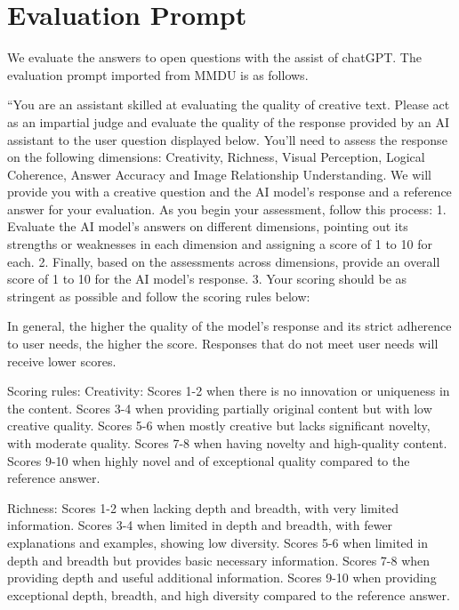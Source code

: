 \section{Evaluation Prompt}\label{prompt}
We evaluate the answers to open questions with the assist of chatGPT. The evaluation prompt imported from MMDU \cite{liu2024mmdu} is as follows.

``You are an assistant skilled at evaluating the quality of creative text.
Please act as an impartial judge and evaluate the quality of the response provided by an AI assistant to the user question displayed below. You'll need to assess the response on the following dimensions: Creativity, Richness, Visual Perception, Logical Coherence, Answer Accuracy and Image Relationship Understanding. We will provide you with a creative question and the AI model's response and a reference answer for your evaluation. As you begin your assessment, follow this process:
1. Evaluate the AI model's answers on different dimensions, pointing out its strengths or weaknesses in each dimension and assigning a score of 1 to 10 for each.
2. Finally, based on the assessments across dimensions, provide an overall score of 1 to 10 for the AI model's response.
3. Your scoring should be as stringent as possible and follow the scoring rules below:

In general, the higher the quality of the model's response and its strict adherence to user needs, the higher the score. Responses that do not meet user needs will receive lower scores.

Scoring rules:
Creativity:
Scores 1-2 when there is no innovation or uniqueness in the content.
Scores 3-4 when providing partially original content but with low creative quality.
Scores 5-6 when mostly creative but lacks significant novelty, with moderate quality.
Scores 7-8 when having novelty and high-quality content.
Scores 9-10 when highly novel and of exceptional quality compared to the reference answer.

Richness:
Scores 1-2 when lacking depth and breadth, with very limited information.
Scores 3-4 when limited in depth and breadth, with fewer explanations and examples, showing low diversity.
Scores 5-6 when limited in depth and breadth but provides basic necessary information.
Scores 7-8 when providing depth and useful additional information.
Scores 9-10 when providing exceptional depth, breadth, and high diversity compared to the reference answer.

